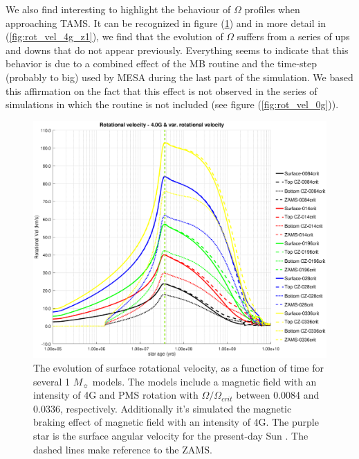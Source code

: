 \documentclass[fleqn,usenatbib]{mnras}
\begin{document}
We also find interesting to highlight the behaviour of $\Omega$ profiles when approaching TAMS. It can be recognized in figure (\ref{fig:rot_vel_4g}) and in more detail in (\ref{fig:rot_vel_4g_z1}), we find that the evolution of $\Omega$ suffers from a series of ups and downs that do not appear previously. Everything seems to indicate that this behavior is due to a combined effect of the MB routine and the time-step (probably to big) used by MESA during the last part of the simulation. We based this affirmation on the fact that this effect is not observed in the series of simulations in which the routine is not included (see figure (\ref{fig:rot_vel_0g})).\par

\begin{figure}
	\includegraphics[trim = 30mm 15mm 20mm 15mm, clip,width=\columnwidth]{figures/rot_vel_var_vel_4_0g.eps}
    \caption{The evolution of surface rotational velocity, as a function of time for several 1 $M_{\sun}$ models. The models include a magnetic field with an intensity of 4G and PMS rotation with $\Omega / \Omega_{crit}$ between 0.0084 and 0.0336, respectively. Additionally it's simulated the magnetic braking effect of magnetic field with an intensity of 4G. The purple star is the surface angular velocity for the present-day Sun \citep{Gill2012}. The dashed lines make reference to the ZAMS.}
    \label{fig:rot_vel_4g}
\end{figure}
\end{document}
